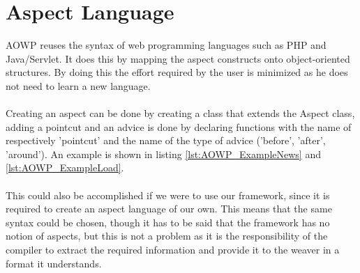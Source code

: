 \documentclass[a4paper]{report}
\begin{document}
\section{Aspect Language}
AOWP reuses the syntax of web programming languages such as PHP and Java/Servlet. It does this by mapping the aspect constructs onto object-oriented structures. By doing this the effort required by the user is minimized as he does not need to learn a new language.\\
\\
Creating an aspect can be done by creating a class that extends the Aspect class, adding a pointcut and an advice is done by declaring functions with the name of respectively 'pointcut' and the name of the type of advice ('before', 'after', 'around'). An example is shown in listing \ref{lst:AOWP_ExampleNews} and \ref{lst:AOWP_ExampleLoad}.\\
\\
This could also be accomplished if we were to use our framework, since it is required to create an aspect language of our own. This means that the same syntax could be chosen, though it has to be said that the framework has no notion of aspects, but this is not a problem as it is the responsibility of the compiler to extract the required information and provide it to the weaver in a format it understands.
\end{document}

